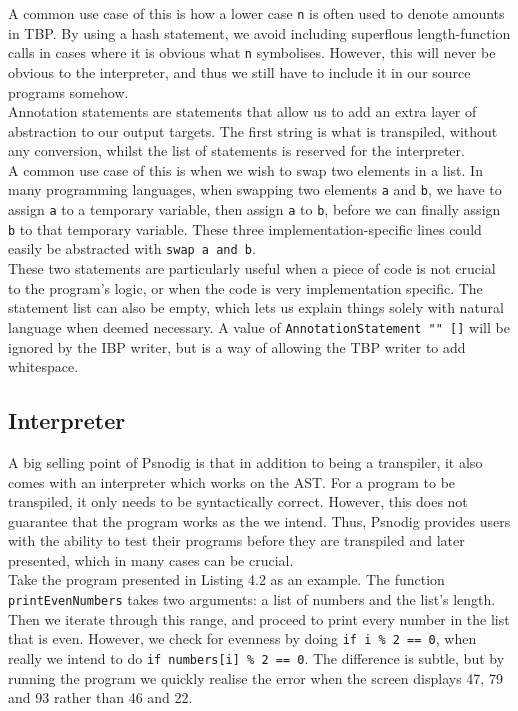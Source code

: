 A common use case of this is how a lower case \texttt{n} is often used to denote amounts in TBP. By using a hash statement, we avoid including superflous length-function calls in cases where it is obvious what \texttt{n} symbolises. However, this will never be obvious to the interpreter, and thus we still have to include it in our source programs somehow. \hfill \\

Annotation statements are statements that allow us to add an extra layer of abstraction to our output targets. The first string is what is transpiled, without any conversion, whilst the list of statements is reserved for the interpreter. \hfill \\

A common use case of this is when we wish to swap two elements in a list. In many programming languages, when swapping two elements \texttt{a} and \texttt{b}, we have to assign \texttt{a} to a temporary variable, then assign \texttt{a} to \texttt{b}, before we can finally assign \texttt{b} to that temporary variable. These three implementation-specific lines could easily be abstracted with \texttt{swap a and b}. \hfill \\

These two statements are particularly useful when a piece of code is not crucial to the program's logic, or when the code is very implementation specific. The statement list can also be empty, which lets us explain things solely with natural language when deemed necessary. A value of \texttt{AnnotationStatement "" []} will be ignored by the IBP writer, but is a way of allowing the TBP writer to add whitespace.

\subsection{Interpreter}

A big selling point of Psnodig is that in addition to being a transpiler, it also comes with an interpreter which works on the AST. For a program to be transpiled, it only needs to be syntactically correct. However, this does not guarantee that the program works as the we intend. Thus, Psnodig provides users with the ability to test their programs before they are transpiled and later presented, which in many cases can be crucial. \hfill \\

Take the program presented in Listing 4.2 as an example. The function \\ \texttt{printEvenNumbers} takes two arguments: a list of numbers and the list's length. Then we iterate through this range, and proceed to print every number in the list that is even. However, we check for evenness by doing \texttt{if i \% 2 == 0}, when really we intend to do \texttt{if numbers[i] \% 2 == 0}. The difference is subtle, but by running the program we quickly realise the error when the screen displays 47, 79 and 93 rather than 46 and 22. \hfill \\


